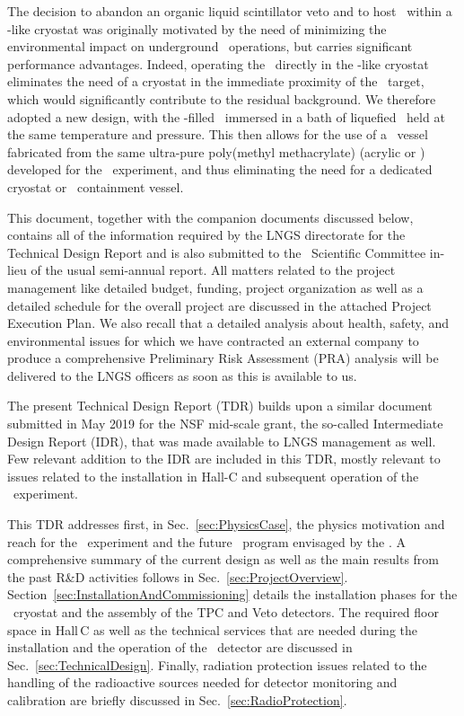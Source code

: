 The decision to abandon an organic liquid scintillator veto and to host \DSks\ within a \pDUNE-like cryostat was originally motivated by the need of minimizing the environmental impact on underground \LNGS\ operations, but carries significant performance advantages.  Indeed, operating the \TPC\ directly in the \pDUNE-like cryostat eliminates the need of a cryostat in the immediate proximity of the \UAr\ target, which would significantly contribute to the residual background.  We therefore adopted a new design, with the \UAr-filled \TPC\  immersed in a bath of liquefied \AAr\ held at the same temperature and pressure.  This then allows for the use of a \TPC\ vessel fabricated from the same ultra-pure poly(methyl methacrylate) (acrylic or \PMMA) developed for the \DEAP\ experiment, and thus eliminating the need for a dedicated cryostat or \UAr\ containment vessel. 


This document, together with the companion documents discussed below, contains all of the information required by the LNGS directorate for the Technical Design Report and is also submitted to the \LNGS\ Scientific Committee in-lieu of the usual semi-annual report. 
All matters related to the project management like detailed budget, funding, project organization as well as a detailed schedule for the overall project are discussed in the attached Project Execution Plan. We also recall that a detailed analysis about health, safety, and environmental issues for which we have contracted an external company to produce a comprehensive Preliminary Risk Assessment (PRA) analysis will be delivered to the LNGS officers as soon as this is available to us.

The present Technical Design Report (TDR) builds upon a similar document submitted in May 2019 for the NSF mid-scale grant, the so-called Intermediate Design Report (IDR), that was made available to LNGS management as well. Few relevant addition to the IDR are included in this TDR, mostly relevant to issues related to the installation in Hall-C and subsequent operation of the \DSks\ experiment.

This TDR addresses first, in Sec.~\ref{sec:PhysicsCase}, the physics motivation and reach for the \DSks\ experiment and the future \LAr\ program envisaged by the \GADMC.  A comprehensive summary of the current design as well as the main results from the past R\&D activities follows in Sec.~\ref{sec:ProjectOverview}. Section~\ref{sec:InstallationAndCommissioning} details the installation phases for the \AAr\ cryostat and the assembly of the TPC and Veto detectors. The required floor space in Hall\,C as well as the technical services that are needed during the installation and the operation of the \DSks\ detector are discussed in Sec.~\ref{sec:TechnicalDesign}. Finally, radiation protection issues related to the handling of the radioactive sources needed for detector monitoring and calibration are briefly discussed in Sec.~\ref{sec:RadioProtection}. 


